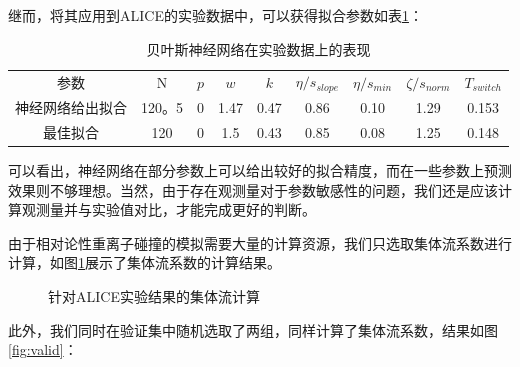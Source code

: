 \documentclass[aps,pre,12pt,preprint,onecolumn,showpacs,showkeys]{revtex4-1}
\begin{document}
继而，将其应用到ALICE的实验数据中，可以获得拟合参数如表\ref{tab:ALICEdata}：\par
\begin{table}[htbp]
\caption{贝叶斯神经网络在实验数据上的表现\label{tab:ALICEdata}}
\begin{ruledtabular}
\begin{tabular}{ccccccccc}
参数&$\mathrm{N}$&$p$&$w$&$k$&$\eta/s_{slope}$&$\eta/s_{min}$&$\zeta/s_{norm}$&$T_{switch}$\\
\colrule
神经网络给出拟合&120。5&0&1.47&0.47&0.86&0.10&1.29&0.153\\
最佳拟合&120&0&1.5&0.43&0.85&0.08&1.25&0.148
\end{tabular}
\end{ruledtabular}
\end{table}
可以看出，神经网络在部分参数上可以给出较好的拟合精度，而在一些参数上预测效果则不够理想。当然，由于存在观测量对于参数敏感性的问题，我们还是应该计算观测量并与实验值对比，才能完成更好的判断。\par
由于相对论性重离子碰撞的模拟需要大量的计算资源，我们只选取集体流系数进行计算，如图\ref{fig:alice}展示了集体流系数的计算结果。\par
\begin{figure}[htbp]
\centering
{}
\caption{针对ALICE实验结果的集体流计算\label{fig:alice}}%
\end{figure}
此外，我们同时在验证集中随机选取了两组，同样计算了集体流系数，结果如图\ref{fig:valid}：\par
\end{document}
